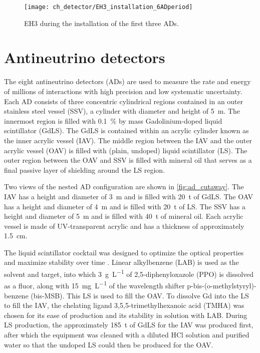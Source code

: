 \begin{figure}
    \centering
    \texttt{[image: ch\_detector/EH3\_installation\_6ADperiod]}
    \caption[View of EH3]{EH3 during the installation of the first three ADs.}
    \label{fig:eh3_wp_photo}
\end{figure}

\section{Antineutrino detectors}

The eight antineutrino detectors (ADs) are used to measure
the rate and energy of millions of \nuebar{} interactions with high precision
and low systematic uncertainty.
Each AD consists of three concentric cylindrical regions
contained in an outer stainless steel vessel (SSV),
a cylinder with diameter and height of \SI{5}{\m}.
The innermost region is filled with \SI{0.1}{\percent} by mass
Gadolinium-doped liquid scintillator (GdLS).
The GdLS is contained within an acrylic cylinder known as the inner acrylic vessel (IAV).
The middle region between the IAV and the outer acrylic vessel (OAV) is filled
with (plain, undoped) liquid scintillator (LS).
The outer region between the OAV and SSV is filled with mineral oil
that serves as a final passive layer of shielding around the LS region.

Two views of the nested AD configuration are shown in \cref{fig:ad_cutaway}.
The IAV has a height and diameter of \SI{3}{\m} and is filled with \SI{20}{\tonne}
of GdLS.
The OAV has a height and diameter of \SI{4}{\m} and is filled with \SI{20}{\tonne}
of LS.
The SSV has a height and diameter of \SI{5}{\m} and is filled with \SI{40}{\tonne}
of mineral oil.
Each acrylic vessel is made of UV-transparent acrylic
and has a thickness of approximately \SI{1.5}{\cm}.

The liquid scintillator cocktail was designed to optimize the optical properties
and maximize stability over time \cite{gdls2014}.
Linear alkylbenzene (LAB) is used as the solvent and \nuebar{} target,
into which \SI{3}{\g\per\liter} of 2,5-diphenyloxazole (PPO)
is dissolved as a fluor,
along with \SI{15}{\mg\per\liter} of the wavelength shifter
p-bis-(o-methylstyryl)-benzene (bis-MSB).
This LS is used to fill the OAV.
To dissolve Gd into the LS to fill the IAV, the chelating ligand
3,5,5-trimethylhexanoic acid (TMHA) was chosen for its ease of production
and its stability in solution with LAB.
During LS production, the approximately \SI{185}{\tonne} of GdLS for the IAV
was produced first,
after which the equipment was cleaned with a diluted HCl solution and purified water
so that the undoped LS could then be produced for the OAV.

